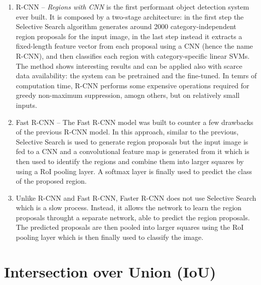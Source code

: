 \begin{enumerate}[label=(\alph*)]
  \item R-CNN -- \emph{Regions with CNN} is the first performant
  object detection system ever built. It is composed by a two-stage
  architecture: in the first step the Selective Search algorithm
  generates around 2000 category-independent region proposals for the
  input image, in the last step instead it extracts a fixed-length
  feature vector from each proposal using a CNN (hence the name
  R-CNN), and then classifies each region with category-specific
  linear SVMs. The method shows interesting results and can be applied
  also with scarce data availability: the system can be pretrained and
  the fine-tuned. In temrs of computation time, R-CNN performs some
  expensive operations required for greedy non-maximum suppression,
  amogn others, but on relatively small inputs.
  \item Fast R-CNN -- The Fast R-CNN model was built to counter a few
  drawbacks of the previous R-CNN model. In this approach, similar to
  the previous, Selective Search is used to generate region proposals
  but the input image is fed to a CNN and a convolutional feature map
  is generated from it which is then used to identify the regions and
  combine them into larger squares by using a RoI pooling layer. A
  softmax layer is finally used to predict the class of the proposed
  region.
  \item Unlike R-CNN and Fast R-CNN, Faster R-CNN does not use
  Selective Search which is a slow process. Instead, it allows the
  network to learn the region proposals throught a separate network,
  able to predict the region proposals. The predicted proposals are
  then pooled into larger squares using the RoI pooling layer which is
  then finally used to classify the image.
\end{enumerate}


\section{Intersection over Union (IoU)}

